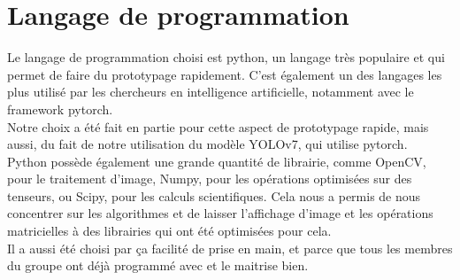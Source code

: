 \section{Langage de programmation}
Le langage de programmation choisi est python, un langage très populaire et qui permet de faire du prototypage rapidement. C'est également un des langages les plus utilisé par les chercheurs en intelligence artificielle, notamment avec le framework pytorch.\\
Notre choix a été fait en partie pour cette aspect de prototypage rapide, mais aussi, du fait de notre utilisation du modèle YOLOv7\cite{wang_yolov7_nodate}, qui utilise pytorch.\\
Python possède également une grande quantité de librairie, comme OpenCV, pour le traitement d'image, Numpy, pour les opérations optimisées sur des tenseurs, ou Scipy, pour les calculs scientifiques. Cela nous a permis de nous concentrer sur les algorithmes et de laisser l'affichage d'image et les opérations matricielles à des librairies qui ont été optimisées pour cela.\\
Il a aussi été choisi par ça facilité de prise en main, et parce que tous les membres du groupe ont déjà programmé avec et le maitrise bien.


\clearpage